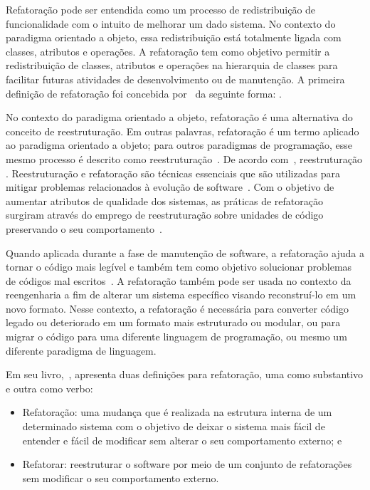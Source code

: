 Refatoração pode ser entendida como um processo de redistribuição de funcionalidade com o intuito de melhorar um dado sistema. No contexto do paradigma orientado a objeto, essa redistribuição está totalmente ligada com classes, atributos e operações. A refatoração tem como objetivo permitir a redistribuição de classes, atributos e operações na hierarquia de classes para facilitar futuras atividades de desenvolvimento ou de manutenção. A primeira definição de refatoração foi concebida por~ da seguinte forma: .

No contexto do paradigma orientado a objeto, refatoração é uma alternativa do conceito de reestruturação. Em outras palavras, refatoração é um termo aplicado ao paradigma orientado a objeto; para outros paradigmas de programação, esse mesmo processo é descrito como reestruturação~\cite{Chikofsky_cross}. De acordo com~, reestruturação . Reestruturação e refatoração são técnicas essenciais que são utilizadas para mitigar problemas relacionados à evolução de software~\cite{OPDYKE_1992}. Com o objetivo de aumentar atributos de qualidade dos sistemas, as práticas de refatoração surgiram através do emprego de reestruturação sobre unidades de código preservando o seu comportamento~\cite{Chikofsky_cross,OPDYKE_1992}.

Quando aplicada durante a fase de manutenção de software, a refatoração ajuda a tornar o código mais legível e também tem como objetivo solucionar problemas de códigos mal escritos~\cite{Chikofsky_cross}. A refatoração também pode ser usada no contexto da reengenharia a fim de alterar um sistema específico visando reconstruí-lo em um novo formato. Nesse contexto, a refatoração é necessária para converter código legado ou deteriorado em um formato mais estruturado ou modular, ou para migrar o código para uma diferente linguagem de programação, ou mesmo um diferente paradigma de linguagem.

Em seu livro,~, apresenta duas definições para refatoração, uma como substantivo e outra como verbo:

\begin{itemize}
	\item Refatoração: uma mudança que é realizada na estrutura interna de um determinado sistema com o objetivo de deixar o sistema mais fácil de entender e fácil de modificar sem alterar o seu comportamento externo; e
	\item Refatorar: reestruturar o software por meio de um conjunto de refatorações sem modificar o seu comportamento externo.
\end{itemize}

